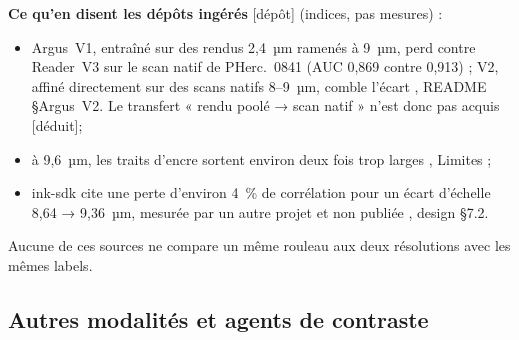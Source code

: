\documentclass[11pt,a4paper]{article}
\newcommand{\deduit}{\textsf{\small[déduit]}}
\newcommand{\depot}{\textsf{\small[dépôt]}}
\newcommand{\pherc}[1]{PHerc.~#1}
\begin{document}
\noindent \textbf{Ce qu'en disent les dépôts ingérés} \depot{} (indices, pas mesures) :
\begin{itemize}
  \item Argus~V1, entraîné sur des rendus 2,4~µm ramenés à 9~µm, perd contre Reader~V3 sur
  le scan natif de \pherc{0841} (AUC 0,869 contre 0,913) ; V2, affiné directement sur des
  scans natifs 8–9~µm, comble l'écart \cite{ruiconte2026}, README §Argus~V2. Le transfert
  « rendu poolé → scan natif » n'est donc pas acquis \deduit ;
  \item à 9,6~µm, les traits d'encre sortent environ deux fois trop larges
  \cite{devore2026}, Limites ;
  \item ink-sdk cite une perte d'environ 4~\% de corrélation pour un écart d'échelle
  8,64 → 9,36~µm, mesurée par un autre projet et non publiée \cite{limegs2026sdk}, design §7.2.
\end{itemize}
Aucune de ces sources ne compare un même rouleau aux deux résolutions avec les mêmes labels.

\subsection{Autres modalités et agents de contraste}
\end{document}
